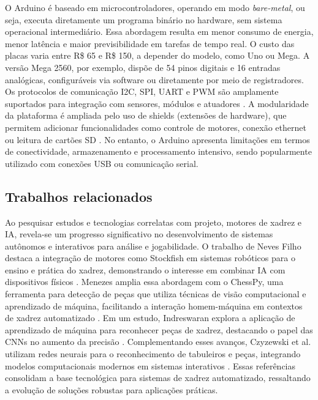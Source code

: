 \documentclass[journal]{IEEEtran} %
\begin{document}
O Arduino é baseado em microcontroladores, operando em modo \textit{bare-metal}, ou seja, executa diretamente um programa binário no hardware, sem sistema operacional intermediário. Essa abordagem resulta em menor consumo de energia, menor latência e maior previsibilidade em tarefas de tempo real. O custo das placas varia entre R\$ 65 e R\$ 150, a depender do modelo, como Uno ou Mega. A versão Mega 2560, por exemplo, dispõe de 54 pinos digitais e 16 entradas analógicas, configuráveis via software ou diretamente por meio de registradores. Os protocolos de comunicação I2C, SPI, UART e PWM são amplamente suportados para integração com sensores, módulos e atuadores \cite{totalphase2021i2cspi}. A modularidade da plataforma é ampliada pelo uso de shields (extensões de hardware), que permitem adicionar funcionalidades como controle de motores, conexão ethernet ou leitura de cartões SD \cite{microchip2021atmega2560}. No entanto, o Arduino apresenta limitações em termos de conectividade, armazenamento e processamento intensivo, sendo popularmente utilizado com conexões USB ou comunicação serial.

\subsection{Trabalhos relacionados}

Ao pesquisar estudos e tecnologias correlatas com projeto, motores de xadrez e IA, revela-se um progresso significativo no desenvolvimento de sistemas autônomos e interativos para análise e jogabilidade. O trabalho de Neves Filho destaca a integração de motores como Stockfish em sistemas robóticos para o ensino e prática do xadrez, demonstrando o interesse em combinar IA com dispositivos físicos \cite{nevesfilho2021xadrez}. Menezes amplia essa abordagem com o ChessPy, uma ferramenta para detecção de peças que utiliza técnicas de visão computacional e aprendizado de máquina, facilitando a interação homem-máquina em contextos de xadrez automatizado \cite{menezes2022}. Em um estudo, Indreswaran explora a aplicação de aprendizado de máquina para reconhecer peças de xadrez, destacando o papel das CNNs no aumento da precisão \cite{indreswaran2016}. Complementando esses avanços, Czyzewski et al. utilizam redes neurais para o reconhecimento de tabuleiros e peças, integrando modelos computacionais modernos em sistemas interativos \cite{czyzewski2020}. Essas referências consolidam a base tecnológica para sistemas de xadrez automatizado, ressaltando a evolução de soluções robustas para aplicações práticas.
\end{document}
